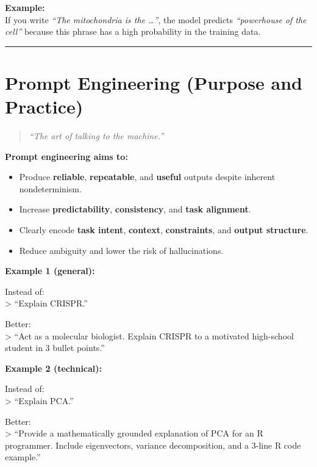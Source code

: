 \documentclass[
  letterpaper,
  DIV=11,
  numbers=noendperiod]{scrreprt}
\providecommand{\tightlist}{%
  \setlength{\itemsep}{0pt}\setlength{\parskip}{0pt}}
\begin{document}
\textbf{Example:}\\
If you write \emph{``The mitochondria is the \ldots{}''}, the model
predicts \emph{``powerhouse of the cell''} because this phrase has a
high probability in the training data.

\begin{center}\rule{0.5\linewidth}{0.5pt}\end{center}

\section{Prompt Engineering (Purpose and
Practice)}\label{prompt-engineering-purpose-and-practice}

\begin{quote}
\emph{``The art of talking to the machine.''}
\end{quote}

\textbf{Prompt engineering aims to:}

\begin{itemize}
\tightlist
\item
  Produce \textbf{reliable}, \textbf{repeatable}, and \textbf{useful}
  outputs despite inherent nondeterminism.
\item
  Increase \textbf{predictability}, \textbf{consistency}, and
  \textbf{task alignment}.
\item
  Clearly encode \textbf{task intent}, \textbf{context},
  \textbf{constraints}, and \textbf{output structure}.
\item
  Reduce ambiguity and lower the risk of hallucinations.
\end{itemize}

\textbf{Example 1 (general):}

Instead of:\\
\textgreater{} ``Explain CRISPR.''

Better:\\
\textgreater{} ``Act as a molecular biologist. Explain CRISPR to a
motivated high-school student in 3 bullet points.''

\textbf{Example 2 (technical):}

Instead of:\\
\textgreater{} ``Explain PCA.''

Better:\\
\textgreater{} ``Provide a mathematically grounded explanation of PCA
for an R programmer. Include eigenvectors, variance decomposition, and a
3-line R code example.''
\end{document}
